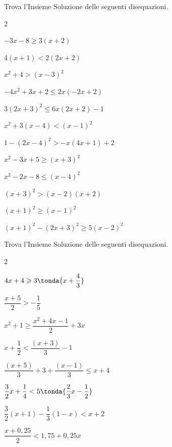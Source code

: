 \begin{esercizio}[]
\label{ese:dis_12}
Trova l'Insieme Soluzione delle seguenti disequazioni.
\begin{htmulticols}{2}
\begin{enumeratea}
\item \(-3x-8 \geqslant 3(x+2)\)
\item \(4(x+1) < 2(2x+2)\)
\item \(x^{2}+4 > (x-3)^2\)
\item \(-4x^2 +3x+2 \leqslant 2x(-2x+2)\)
\item \(3(2x+3)^2 \leqslant 6x(2x+2)-1\)
\item \(x^{2}+3(x-4) < (x-1)^2\)
\item \(1-(2x-4)^{2} > -x(4x+1)+2\)
\item \(x^2-3x+5 \geqslant (x+3)^2\)
\item \(x^2-2x-8 \leqslant (x-4)^2\)
\item \((x+3)^{2} > (x-2)(x+2)\)
\item \((x+1)^{2} \geqslant (x-1)^{2}\)
\item \((x+1)^{2}-(2x +3)^2 \geqslant 5(x-2)^{2}\)
\end{enumeratea}
\end{htmulticols}
\end{esercizio}

\begin{esercizio}[*]
\label{ese:dis_14}
Trova l'Insieme Soluzione delle seguenti disequazioni.
\begin{htmulticols}{2}
\begin{enumeratea}
\item \(4x+4\geqslant 3\tonda{x+\dfrac{4}{3}}\)
\item \(\dfrac{x+5}{2}>-{\dfrac{1}{5}}\)
\item \(x^2+1\ge\dfrac{x^2+4x-1}{2}+3x\)
\item \(x+\dfrac{1}{2}<\dfrac{(x+3)}{3}-1\)
\item \(\dfrac{(x+5)}{3}+3+\dfrac{(x-1)}{3}\leqslant x+4\)
\item \(\dfrac{3}{2}x+\dfrac{1}{4} <
      5\tonda{\dfrac{2}{3}x-\dfrac{1}{2}}\)
\item \(\dfrac{3}{2}(x+1)-\dfrac{1}{3}(1-x)<x+2\)
\item \(\dfrac{x+0,25}{2}<1,75+0,25x\)
\end{enumeratea}
\end{htmulticols}
\end{esercizio}


